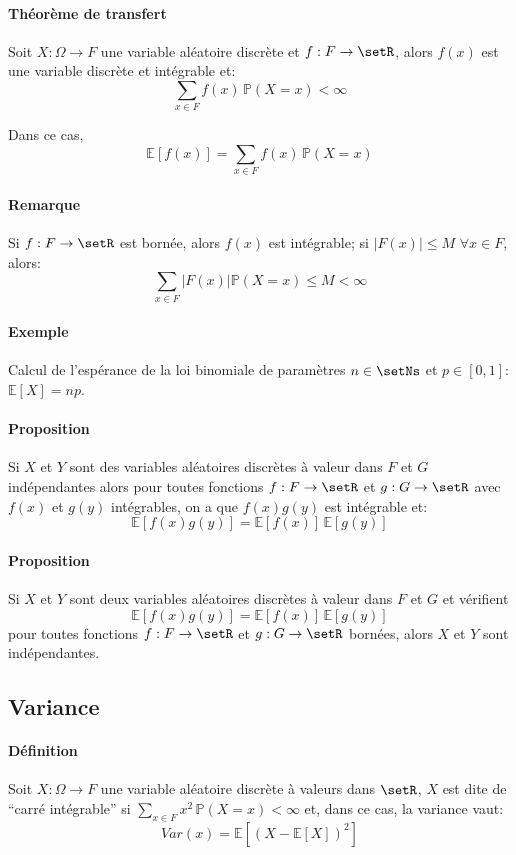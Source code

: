\documentclass[a4paper,10pt,french,openany]{memoir}
\newcommand{\Proba}{\mathbb{P}}
\newcommand{\Esper}{\mathbb{E}}
\newcommand{\Var}{Var}
\newcommand{\abs}[1]{\lvert #1 \rvert}
\begin{document}
\paragraph{Théorème de transfert}
Soit $X:\Omega \rightarrow F$ une variable aléatoire discrète et $f:F \rightarrow \setR$, alors $f(x)$ est une variable discrète et intégrable et: \[\sum_{x\in F} f(x) \,\Proba(X=x) < \infty\]

Dans ce cas, \[\Esper[f(x)] = \sum_{x\in F} f(x) \,\Proba(X=x)\]

\paragraph{Remarque}
Si $f: F\rightarrow\setR$ est bornée, alors $f(x)$ est intégrable; si $\abs{F(x)} \leq M$ $\forall x \in F$, alors: \[\sum_{x\in F} \abs{F(x)} \Proba(X=x) \leq M < \infty\]

\paragraph{Exemple}
Calcul de l'espérance de la loi binomiale de paramètres $n\in\setNs$ et $p\in[0,1]$: $\Esper[X]=n p$.

\paragraph{Proposition}
Si $X$ et $Y$ sont des variables aléatoires discrètes à valeur dans $F$ et $G$ indépendantes alors pour toutes fonctions $f: F\rightarrow \setR$ et $g: G\rightarrow \setR$ avec $f(x)$ et $g(y)$ intégrables, on a que $f(x) g(y)$ est intégrable et:\[\Esper[f(x) g(y)]=\Esper[f(x)] \,\Esper[g(y)]\]

\paragraph{Proposition}
Si $X$ et $Y$ sont deux variables aléatoires discrètes à valeur dans $F$ et $G$ et vérifient \[\Esper[f(x) g(y)] = \Esper[f(x)]\,\Esper[g(y)]\] pour toutes fonctions $f:F\rightarrow \setR$ et $g: G\rightarrow \setR$ bornées, alors $X$ et $Y$ sont indépendantes.

\subsection{Variance}

\paragraph{Définition}
Soit $X:\Omega \rightarrow F$ une variable aléatoire discrète à valeurs dans $\setR$, $X$ est dite de ``carré intégrable'' si $\sum_{x\in F}x^2\, \Proba(X=x) < \infty$ et, dans ce cas, la variance vaut: \[\Var(x)=\Esper[(X-\Esper[X])^2]\]
\end{document}
